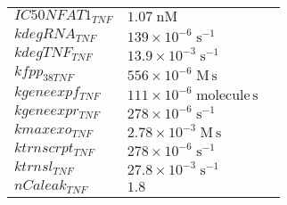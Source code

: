 \documentclass[a4paper,10.0pt]{article}
\begin{document}
{\begin{longtabu}{| l l l |}
  $IC50NFAT1_{TNF}$\hspace{0.5cm} & $1.07\;\mathrm{nM}$\hspace{0.5cm} & \hspace{0.5cm}\\
  $kdegRNA_{TNF}$\hspace{0.5cm} & $139\!\times\!10 ^{-6}\;\mathrm{s}^{-1}$\hspace{0.5cm} & \hspace{0.5cm}\\
  $kdegTNF_{TNF}$\hspace{0.5cm} & $13.9\!\times\!10 ^{-3}\;\mathrm{s}^{-1}$\hspace{0.5cm} & \hspace{0.5cm}\\
  $kfpp_{38 TNF}$\hspace{0.5cm} & $556\!\times\!10 ^{-6}\;\mathrm{M}\,\mathrm{s}$\hspace{0.5cm} & \hspace{0.5cm}\\
  $kgeneexpf_{TNF}$\hspace{0.5cm} & $111\!\times\!10 ^{-6}\;\mathrm{molecule}\,\mathrm{s}$\hspace{0.5cm} & \hspace{0.5cm}\\
  $kgeneexpr_{TNF}$\hspace{0.5cm} & $278\!\times\!10 ^{-6}\;\mathrm{s}^{-1}$\hspace{0.5cm} & \hspace{0.5cm}\\
  $kmaxexo_{TNF}$\hspace{0.5cm} & $2.78\!\times\!10 ^{-3}\;\mathrm{M}\,\mathrm{s}$\hspace{0.5cm} & \hspace{0.5cm}\\
  $ktrnscrpt_{TNF}$\hspace{0.5cm} & $278\!\times\!10 ^{-6}\;\mathrm{s}^{-1}$\hspace{0.5cm} & \hspace{0.5cm}\\
  $ktrnsl_{TNF}$\hspace{0.5cm} & $27.8\!\times\!10 ^{-3}\;\mathrm{s}^{-1}$\hspace{0.5cm} & \hspace{0.5cm}\\
  $nCaleak_{TNF}$\hspace{0.5cm} & $1.8$\hspace{0.5cm} & \hspace{0.5cm}\\

\end{longtabu}}
\end{document}
